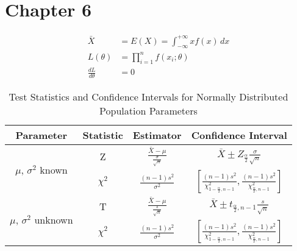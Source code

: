 \documentclass[12pt]{article}
\begin{document}
\section{Chapter 6}

\begin{align}
    \bar{X} &= E(X)= \int_{-\infty}^{+\infty} xf(x) \,dx \\
    L(\theta) &= \prod _{i=1}^{n}f(x_i;\theta) \\
    \frac{dL}{d\theta} &= 0 
\end{align}



    
\begin{table}[ht]
    \centering
    \caption{Test Statistics and Confidence Intervals for Normally Distributed Population Parameters}
    \renewcommand{\arraystretch}{1.5}
    \begin{tabular}{|c|c|c|c|}
    \hline
    \textbf{Parameter} & \textbf{Statistic} & \textbf{Estimator} & \textbf{Confidence Interval} \\ \hline
    \multirow{2}{*}{$\mu$, $\sigma^2$ known} & Z & $\frac{\bar{X}-\mu}{\frac{\sigma}{\sqrt{n}}}$ & $\bar{X} \pm Z_{\frac{\alpha}{2}}\frac{\sigma}{\sqrt{n}}$ \\ \cline{2-4} 
    & $\chi^2$ & $\frac{(n-1)s^2}{\sigma^2}$ & $\left[\frac{(n-1)s^2}{\chi^2_{1-\frac{\alpha}{2}, n-1}}, \frac{(n-1)s^2}{\chi^2_{\frac{\alpha}{2}, n-1}}\right]$ \\ \hline
    \multirow{2}{*}{$\mu$, $\sigma^2$ unknown} & T & $\frac{\bar{X}-\mu}{\frac{s}{\sqrt{n}}}$ & $\bar{X} \pm t_{\frac{\alpha}{2}, n-1}\frac{s}{\sqrt{n}}$ \\ \cline{2-4} 
    & $\chi^2$ & $\frac{(n-1)s^2}{\sigma^2}$ & $\left[\frac{(n-1)s^2}{\chi^2_{1-\frac{\alpha}{2}, n-1}}, \frac{(n-1)s^2}{\chi^2_{\frac{\alpha}{2}, n-1}}\right]$ \\ \hline
    \end{tabular}
    \label{tab:normal_distribution_statistics}
\end{table}
\end{document}
